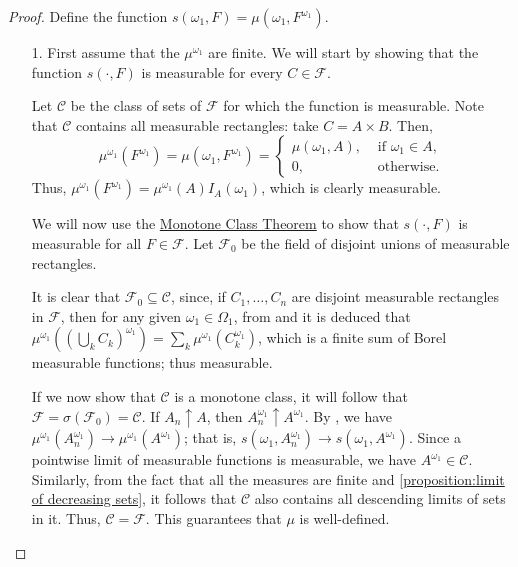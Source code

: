 \begin{proof}
Define the function \(s(\omega_1,F)=\mu\left(\omega_1,F^{\omega_1}\right)\).

  \begin{enumerate}
      \item[1.] First assume that the \(\mu^{\omega_1}\) are finite.
          We will start by showing that the function
		  \(s(\cdot,F)\) is measurable for every \(C\in\mathcal{F}\).

		  Let \(\mathcal{C}\) be the class of sets of \(\mathcal{F}\) for which the function is measurable.
		  Note that \(\mathcal{C}\) contains all measurable rectangles: take \(C=A\times B\).
		  Then,
		  \[\mu^{\omega_1}(F^{\omega_1})=\mu(\omega_{1	},F^{\omega_1})=\left\{\begin{array}{rl}
													 \mu(\omega_{1	},A),& \text{ if }\omega_{1	}\in A,\\
													 0,& \text{ otherwise.}

												   \end{array}\right.\]
Thus, \(\mu^{\omega_1}(F^{\omega_1})=\mu^{\omega_1}(A)I_A(\omega_1)\),
          which is clearly measurable.

					We will now use the \hyperref[theorem:Monotone Class]{Monotone Class Theorem}
          to show that \(s(\cdot,F)\) is measurable for all \(F\in\mathcal{F}\). Let \(\mathcal{F}_0\) be the
          field of disjoint unions of measurable rectangles.

          It is clear that \(\mathcal{F}_0\subseteq\mathcal{C}\), since, if
          \(C_1,\dotsc,C_n\) are disjoint measurable rectangles in  \(\mathcal{F}\), then for any
          given \(\omega_1\in\Omega_1\), from  and  
          it is deduced that \(\mu^{\omega_1}(\left(
          \bigcup_{k}C_k\right)^{\omega_1})=\sum_{k}\mu^{\omega_1}\left(C_k^{\omega_1}\right)\),
          which is a finite sum of Borel measurable functions; thus measurable.

          If we now show that \(\mathcal{C}\) is a monotone class, it will follow
          that \(\mathcal{F}=\sigma\left(\mathcal{F}_0\right)=\mathcal{C}\). If 
          \(A_n\uparrow A\), then  \(A_n^{\omega_1}\uparrow 
          A^{\omega_1}\). By , 
          we have \(\mu^{\omega_1}\left( 
          A_n^{\omega_1}\right)\to\mu^{\omega_1}\left(A^{\omega_1}\right)\); that is, \(s(\omega_1,A_n^{\omega_1})\to s(\omega_1,A^{\omega_1})\). Since a pointwise limit of measurable functions is measurable, we have  \(A^{\omega_1}\in\mathcal{C}\).
          Similarly, from the fact that all the measures are finite and \ref{proposition:limit of decreasing sets}, it
          follows that \(\mathcal{C}\) also contains all descending limits
          of sets in it. Thus, \(\mathcal{C}=\mathcal{F}\). This guarantees
          that \(\mu\) is well-defined.


\end{enumerate}
\end{proof}
